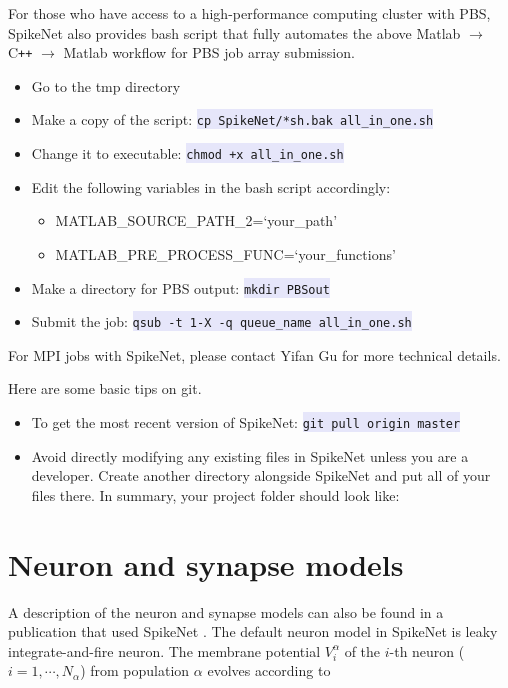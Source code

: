\documentclass{article}
\newcommand{\mylstinline}[1] {\colorbox{Lavender}{\lstinline[basicstyle=\ttfamily\footnotesize\color{Black}]|#1|} }
\begin{document}
For those who have access to a high-performance computing cluster with PBS, SpikeNet also provides bash script that fully automates the above Matlab $\rightarrow$  C\texttt{++}  $\rightarrow$ Matlab workflow for PBS job array submission. 
\begin{itemize}
\item Go to the tmp directory
\item Make a copy of the script: \mylstinline{cp SpikeNet/*sh.bak all_in_one.sh}
\item Change it to executable: \mylstinline{chmod +x all_in_one.sh}
\item Edit the following variables in the bash script accordingly: 
\begin{itemize}
\item {\footnotesize MATLAB\_SOURCE\_PATH\_2=`your\_path'}
\item {\footnotesize MATLAB\_PRE\_PROCESS\_FUNC=`your\_functions'}
\end{itemize}
\item Make a directory for PBS output: \mylstinline{mkdir PBSout}
\item Submit the job: \mylstinline{qsub -t 1-X -q queue_name all_in_one.sh}
\end{itemize}
For MPI jobs with SpikeNet, please contact Yifan Gu for more technical details.

Here are some basic tips on git.
\begin{itemize}
\item To get the most recent version of SpikeNet: \mylstinline{git pull origin master}
\item Avoid directly modifying any existing files in SpikeNet unless you are a developer. Create another directory alongside SpikeNet and put all of your files there. In summary, your project folder should look like:
\end{itemize}
\hfill\begin{minipage}{\dimexpr\textwidth-1cm}
\xdef\tpd{\the\prevdepth}
\end{minipage}
\section{Neuron and synapse models}
\label{sec:model}

A description of the neuron and synapse models can also be found in a publication that used SpikeNet \cite{Gu2016}.
The default neuron model in SpikeNet is leaky integrate-and-fire neuron. 
The membrane potential $V^{\alpha}_{i}$ of the $i$-th neuron ($i=1,\cdots,N_{\alpha}$) from population $\alpha$ evolves according to
\end{document}
